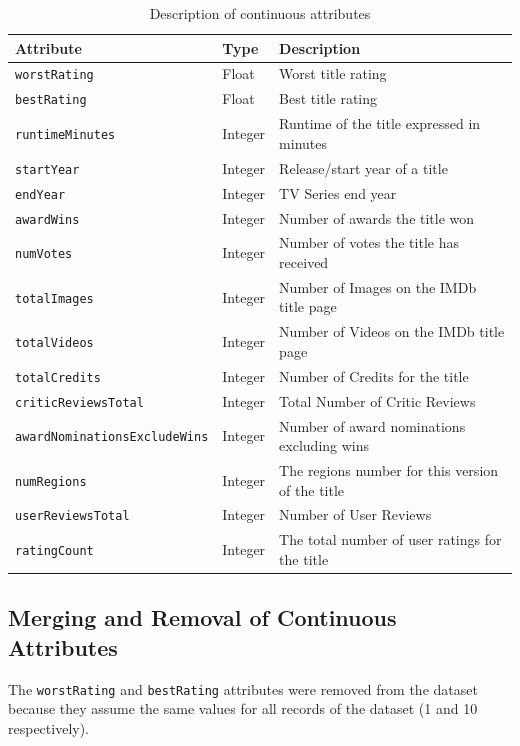 \begin{table}[h]
    \centering
    \begin{tabular}{|l|l|l|} %
        \hline
        \textbf{Attribute} & \textbf{Type} & \textbf{Description} \\
        \hline
        \texttt{worstRating} & Float & Worst title rating \\ 
        \hline
        \texttt{bestRating} & Float & Best title rating \\ 
        \hline
        \texttt{runtimeMinutes} & Integer & Runtime of the title expressed in minutes \\ 
        \hline
        \texttt{startYear} & Integer & Release/start year of a title \\ 
        \hline
        \texttt{endYear} & Integer & TV Series end year \\
        \hline
        \texttt{awardWins} & Integer & Number of awards the title won \\ 
        \hline
        \texttt{numVotes} & Integer & Number of votes the title has received \\ 
        \hline
        \texttt{totalImages} & Integer & Number of Images on the IMDb title page \\ 
        \hline
        \texttt{totalVideos} & Integer & Number of Videos on the IMDb title page \\ 
        \hline
        \texttt{totalCredits} & Integer & Number of Credits for the title \\ 
        \hline
        \texttt{criticReviewsTotal} & Integer & Total Number of Critic Reviews \\ 
        \hline
        \texttt{awardNominationsExcludeWins} & Integer & Number of award nominations excluding wins \\ 
        \hline
        \texttt{numRegions} & Integer & The regions number for this version of the title \\ 
        \hline
        \texttt{userReviewsTotal} & Integer & Number of User Reviews \\ 
        \hline
        \texttt{ratingCount} & Integer & The total number of user ratings for the title \\ 
        \hline
    \end{tabular}
    \caption{Description of continuous attributes}
    \label{tab:numerical_attributes}
\end{table}


\subsection{Merging and Removal of Continuous Attributes}\label{sec:var_elim_creation}
The \texttt{worstRating} and \texttt{bestRating} attributes were removed from the dataset because they
assume the same values for all records of the dataset (1 and 10 respectively).\\

